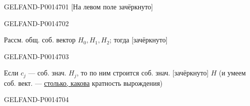 \begin{GelfandAdjacentEvidence}{GELFAND-P001470}{1}
[На левом поле зачёркнуто]
\end{GelfandAdjacentEvidence}
\begin{GelfandAdjacentEvidence}{GELFAND-P001470}{2}


Рассм. общ. соб. вектор \(H_0,H_1,H_2\); тогда [зачёркнуто]
\end{GelfandAdjacentEvidence}
\begin{GelfandAdjacentEvidence}{GELFAND-P001470}{3}


Если \(c_j\) --- соб. знач. \(H_j\), то по ним строится соб. знач. [зачёркнуто] \(H\)
(и умеем соб. вект. --- \uline{столько, какова} кратность вырождения)
\end{GelfandAdjacentEvidence}
\begin{GelfandAdjacentEvidence}{GELFAND-P001470}{4}

\end{GelfandAdjacentEvidence}
